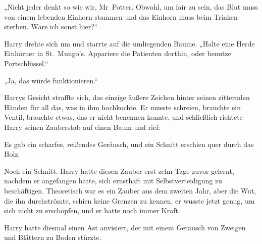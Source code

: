 „Nicht jeder denkt so wie wir, Mr~Potter. Obwohl, um fair zu sein, das Blut muss von einem lebenden Einhorn stammen und das Einhorn muss beim Trinken sterben. Wäre ich sonst hier?“

Harry drehte sich um und starrte auf die umliegenden Bäume. „Halte eine Herde Einhörner in St.~Mungo’s. Appariere die Patienten dorthin, oder benutze Portschlüssel.“

„Ja, das würde funktionieren.“

Harrys Gesicht straffte sich, das einzige äußere Zeichen hinter seinen zitternden Händen für all das, was in ihm hochkochte. Er musste schreien, brauchte ein Ventil, brauchte etwas, das er nicht benennen konnte, und schließlich richtete Harry seinen Zauberstab auf einen Baum und rief: 

Es gab ein scharfes, reißendes Geräusch, und ein Schnitt erschien quer durch das Holz.


Noch ein Schnitt. Harry hatte diesen Zauber erst zehn Tage zuvor gelernt, nachdem er angefangen hatte, sich ernsthaft mit Selbstverteidigung zu beschäftigen. Theoretisch war es ein Zauber aus dem zweiten Jahr, aber die Wut, die ihn durchströmte, schien keine Grenzen zu kennen, er wusste jetzt genug, um sich nicht zu erschöpfen, und er hatte noch immer Kraft.

 Harry hatte diesmal einen Ast anvisiert, der mit einem Geräusch von Zweigen und Blättern zu Boden stürzte.


